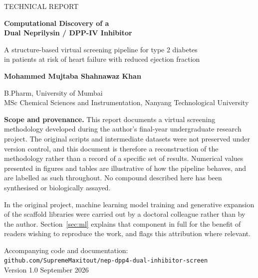 \documentclass[11pt,a4paper]{article}
\begin{document}
\begin{titlepage}
\centering
\vspace*{2.2cm}

{\color{soft}\large TECHNICAL REPORT}

\vspace{1.2cm}

{\Huge\bfseries\color{inkblue} Computational Discovery of a\\[0.3cm] Dual Neprilysin / DPP-IV Inhibitor}

\vspace{0.9cm}

{\Large A structure-based virtual screening pipeline for type 2 diabetes\\[0.2cm]
in patients at risk of heart failure with reduced ejection fraction}

\vspace{2.2cm}

{\large\bfseries Mohammed Mujtaba Shahnawaz Khan}

\vspace{0.4cm}

{\color{soft} B.Pharm, University of Mumbai \\
MSc Chemical Sciences and Instrumentation, Nanyang Technological University}

\vspace{2.4cm}

\begin{minipage}{0.86\textwidth}
\small
\begin{warnbox}
\textbf{Scope and provenance.} This report documents a virtual screening
methodology developed during the author's final-year undergraduate research
project. The original scripts and intermediate datasets were not preserved
under version control, and this document is therefore a reconstruction of the
methodology rather than a record of a specific set of results. Numerical values
presented in figures and tables are illustrative of how the pipeline behaves,
and are labelled as such throughout. No compound described here has been
synthesised or biologically assayed.

\smallskip
In the original project, machine learning model training and generative
expansion of the scaffold libraries were carried out by a doctoral colleague
rather than by the author. Section~\ref{sec:ml} explains that component in full
for the benefit of readers wishing to reproduce the work, and flags this
attribution where relevant.
\end{warnbox}
\end{minipage}

\vfill

{\small\color{soft}
Accompanying code and documentation:\\
\texttt{github.com/SupremeMaxitout/nep-dpp4-dual-inhibitor-screen}\\[0.3cm]
Version 1.0 \quad\textbullet\quad September 2026}

\end{titlepage}
\end{document}
